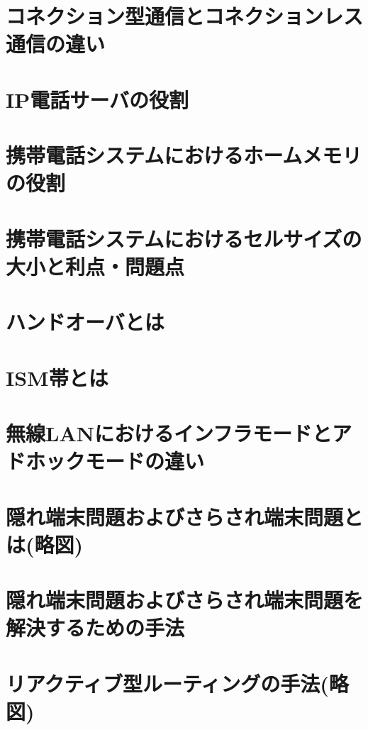 \documentclass[10.5pt]{jsarticle}
\begin{document}
\section{コネクション型通信とコネクションレス通信の違い}


\section{IP電話サーバの役割}


\section{携帯電話システムにおけるホームメモリの役割}


\section{携帯電話システムにおけるセルサイズの大小と利点・問題点}


\section{ハンドオーバとは}


\section{ISM帯とは}


\section{無線LANにおけるインフラモードとアドホックモードの違い}


\section{隠れ端末問題およびさらされ端末問題とは(略図)}


\section{隠れ端末問題およびさらされ端末問題を解決するための手法}


\section{リアクティブ型ルーティングの手法(略図)}
\end{document}

